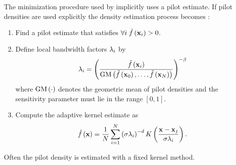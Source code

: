 The minimization procedure used by \citeauthor{breiman1977variable} implicitly uses a \KNN pilot estimate. If pilot densities are used explicitly the density estimation process becomes \cite{silverman1986density}:
	\begin{enumerate}[labelindent=0ex]
		\item Find a pilot estimate \varPilotDensityFunction{\varPattern} that satisfies $\forall i\; \varPilotDensityFunction{\varPattern[i]} > 0$. 

		\item Define local bandwidth factors $\lambda_{i}$ by
			\begin{equation}\label{eq:1:localBandwidth}
				\varLocalBandwidth{i} = \left( \frac{\varPilotDensityFunction{\varPattern[i]}}{\varGeometricMeanFunction{\varPilotDensityFunction{\varPattern[0]}, \dotsc, \varPilotDensityFunction{\varPattern[\varNumPatterns]}}}  \right)^{- \varMBESensitivityParam}
			\end{equation}
			where $\text{GM}\left(\cdot\right)$ denotes the geometric mean of pilot densities and the sensitivity parameter \varMBESensitivityParam must lie in the range $\left[0, 1\right]$.
		\item Compute the adaptive kernel estimate as
			\begin{equation}\label{eq:1:adaptiveKernelEstimateWithLocalBandwidths}
				\varEstimatedDensityFunction{\varPattern} = \frac{1}{\varNumPatterns} \sum_{i = 1}^{\varNumPatterns} \left(\varBandwidth\varLocalBandwidth{i}\right)^{-\varDim} \varKernel{\frac{\varPattern - \varPattern[j]}{\varBandwidth \varLocalBandwidth{i}}}.
			\end{equation}
	\end{enumerate}
Often the pilot density is estimated with a fixed kernel method. 

